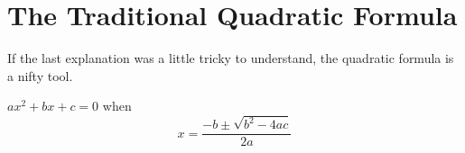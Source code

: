 \section{The Traditional Quadratic Formula}

If the last explanation was a little tricky to understand, the quadratic formula is a nifty tool.

\begin{mdframed}[style=important, frametitle={The Quadratic Formula}]

$ax^2 + bx + c = 0$ when
\begin{equation*}
  x = \frac{-b \pm \sqrt{b^2 - 4ac}}{2a}
\end{equation*}

\end{mdframed}
